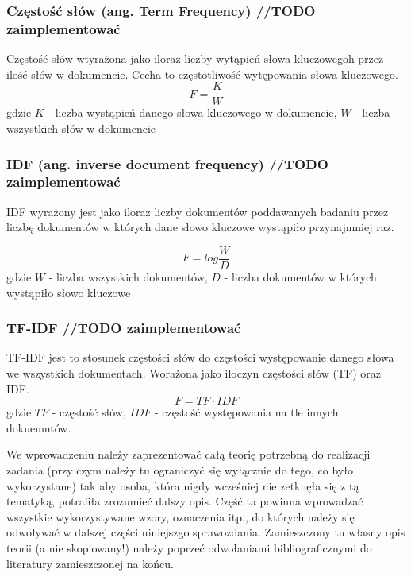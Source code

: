 \documentclass{classrep}
\begin{document}
\subsubsection{Częstość słów (ang. Term Frequency) //TODO zaimplementować}
Częstość słów wtyrażona jako iloraz liczby wytąpień słowa kluczowegoh przez ilość słów w dokumencie. Cecha to
częstotliwość wytępowania słowa kluczowego.
\begin{equation}
    F=\frac{K}{W}
\end{equation}
gdzie $K$ - liczba wystąpień danego słowa kluczowego w dokumencie, $W$ - liczba wszystkich słów w dokumencie

\subsubsection{IDF (ang. inverse document frequency) //TODO zaimplementować}
IDF wyrażony jest jako iloraz liczby dokumentów poddawanych badaniu przez liczbę dokumentów w których dane słowo
kluczowe wystąpiło przynajmniej raz.

\begin{equation}
    F=log \frac{W}{D}
\end{equation}
gdzie $W$ - liczba wszystkich dokumentów, $D$ - liczba dokumentów w których wystąpiło słowo kluczowe

\subsubsection{TF-IDF //TODO zaimplementować}
TF-IDF jest to stosunek częstości słów do częstości występowanie danego słowa we wszystkich dokumentach.
Worażona jako iloczyn częstości słów (TF) oraz IDF.
\begin{equation}
    F={TF}\cdot{IDF}
\end{equation}
gdzie $TF$ - częstość słów, $IDF$ - częstość występowania na tle innych dokuemntów.

\newline \newline
{\color{blue}
We wprowadzeniu należy zaprezentować całą teorię potrzebną do realizacji
zadania (przy czym należy tu ograniczyć się wyłącznie do tego, co było
wykorzystane) tak aby osoba, która nigdy wcześniej nie zetknęła się z tą
tematyką, potrafiła zrozumieć dalszy opis. Część ta powinna wprowadzać
wszystkie wykorzystywane wzory, oznaczenia itp., do których należy się
odwoływać w dalszej części niniejszgo sprawozdania. Zamieszczony tu własny
opis teorii (a nie skopiowany!) należy poprzeć odwołaniami bibliograficznymi
do literatury zamieszczonej na końcu. }
\end{document}
